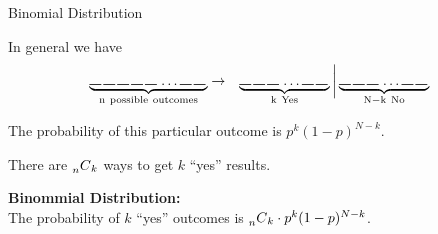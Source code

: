 \begin{frame}{Binomial Distribution}

  In general we have 
  \begin{eqnarray*}
    \underbrace{
      \rule{.3cm}{.2mm} \hspace{.05cm} 
      \rule{.3cm}{.2mm} \hspace{.05cm} 
      \rule{.3cm}{.2mm} \hspace{.05cm} 
      \rule{.3cm}{.2mm} \hspace{.05cm} 
      \rule{.3cm}{.2mm} \hspace{.05cm} \ldots
      \rule{.3cm}{.2mm} \hspace{.05cm} 
      \rule{.3cm}{.2mm} \hspace{.05cm}}_{\mathrm{n~possible~outcomes}}
    & \rightarrow & 
    \underbrace{
      \rule{.3cm}{.2mm} \hspace{.05cm} 
      \rule{.3cm}{.2mm} \hspace{.05cm} 
      \rule{.3cm}{.2mm} \hspace{.05cm} \ldots
      \rule{.3cm}{.2mm} \hspace{.05cm} 
      \rule{.3cm}{.2mm} \hspace{.05cm}}_{\mathrm{k~Yes}}
    \bigg|
    \underbrace{
      \rule{.3cm}{.2mm} \hspace{.05cm} 
      \rule{.3cm}{.2mm} \hspace{.05cm} 
      \rule{.3cm}{.2mm} \hspace{.05cm} \ldots
      \rule{.3cm}{.2mm} \hspace{.05cm} 
      \rule{.3cm}{.2mm} \hspace{.05cm}}_{\mathrm{N-k~No}}
  \end{eqnarray*}

  \vfill

  The probability of this particular outcome is $p^k(1-p)^{N-k}$. 

  \vfill

  There are $\prescript{~}{n}{C}_k$ ways to get $k$ ``yes'' results.
  
  \vfill

  \textbf{Binommial Distribution:}\\
  {\color{red}
    The probability of $k$ ``yes'' outcomes is 
    $\prescript{~}{n}{C}_k \cdot p^k (1-p)^{N-k}$.} 

  \vfill

  
\end{frame}



